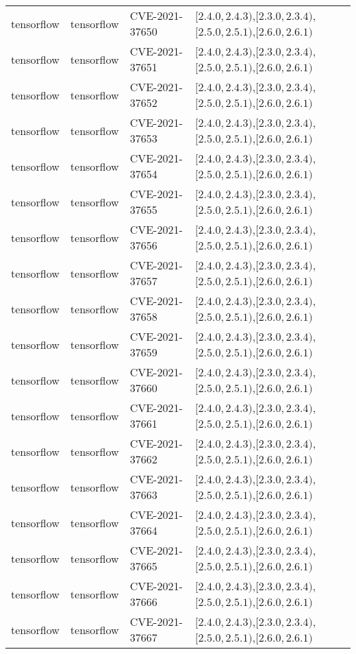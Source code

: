 \begin{tabular}{llll}
tensorflow & tensorflow & CVE-2021-37650 & $[2.4.0,2.4.3)$,$[2.3.0,2.3.4)$,$[2.5.0,2.5.1)$,$[2.6.0,2.6.1)$ \\
tensorflow & tensorflow & CVE-2021-37651 & $[2.4.0,2.4.3)$,$[2.3.0,2.3.4)$,$[2.5.0,2.5.1)$,$[2.6.0,2.6.1)$ \\
tensorflow & tensorflow & CVE-2021-37652 & $[2.4.0,2.4.3)$,$[2.3.0,2.3.4)$,$[2.5.0,2.5.1)$,$[2.6.0,2.6.1)$ \\
tensorflow & tensorflow & CVE-2021-37653 & $[2.4.0,2.4.3)$,$[2.3.0,2.3.4)$,$[2.5.0,2.5.1)$,$[2.6.0,2.6.1)$ \\
tensorflow & tensorflow & CVE-2021-37654 & $[2.4.0,2.4.3)$,$[2.3.0,2.3.4)$,$[2.5.0,2.5.1)$,$[2.6.0,2.6.1)$ \\
tensorflow & tensorflow & CVE-2021-37655 & $[2.4.0,2.4.3)$,$[2.3.0,2.3.4)$,$[2.5.0,2.5.1)$,$[2.6.0,2.6.1)$ \\
tensorflow & tensorflow & CVE-2021-37656 & $[2.4.0,2.4.3)$,$[2.3.0,2.3.4)$,$[2.5.0,2.5.1)$,$[2.6.0,2.6.1)$ \\
tensorflow & tensorflow & CVE-2021-37657 & $[2.4.0,2.4.3)$,$[2.3.0,2.3.4)$,$[2.5.0,2.5.1)$,$[2.6.0,2.6.1)$ \\
tensorflow & tensorflow & CVE-2021-37658 & $[2.4.0,2.4.3)$,$[2.3.0,2.3.4)$,$[2.5.0,2.5.1)$,$[2.6.0,2.6.1)$ \\
tensorflow & tensorflow & CVE-2021-37659 & $[2.4.0,2.4.3)$,$[2.3.0,2.3.4)$,$[2.5.0,2.5.1)$,$[2.6.0,2.6.1)$ \\
tensorflow & tensorflow & CVE-2021-37660 & $[2.4.0,2.4.3)$,$[2.3.0,2.3.4)$,$[2.5.0,2.5.1)$,$[2.6.0,2.6.1)$ \\
tensorflow & tensorflow & CVE-2021-37661 & $[2.4.0,2.4.3)$,$[2.3.0,2.3.4)$,$[2.5.0,2.5.1)$,$[2.6.0,2.6.1)$ \\
tensorflow & tensorflow & CVE-2021-37662 & $[2.4.0,2.4.3)$,$[2.3.0,2.3.4)$,$[2.5.0,2.5.1)$,$[2.6.0,2.6.1)$ \\
tensorflow & tensorflow & CVE-2021-37663 & $[2.4.0,2.4.3)$,$[2.3.0,2.3.4)$,$[2.5.0,2.5.1)$,$[2.6.0,2.6.1)$ \\
tensorflow & tensorflow & CVE-2021-37664 & $[2.4.0,2.4.3)$,$[2.3.0,2.3.4)$,$[2.5.0,2.5.1)$,$[2.6.0,2.6.1)$ \\
tensorflow & tensorflow & CVE-2021-37665 & $[2.4.0,2.4.3)$,$[2.3.0,2.3.4)$,$[2.5.0,2.5.1)$,$[2.6.0,2.6.1)$ \\
tensorflow & tensorflow & CVE-2021-37666 & $[2.4.0,2.4.3)$,$[2.3.0,2.3.4)$,$[2.5.0,2.5.1)$,$[2.6.0,2.6.1)$ \\
tensorflow & tensorflow & CVE-2021-37667 & $[2.4.0,2.4.3)$,$[2.3.0,2.3.4)$,$[2.5.0,2.5.1)$,$[2.6.0,2.6.1)$ \\

\end{tabular}
